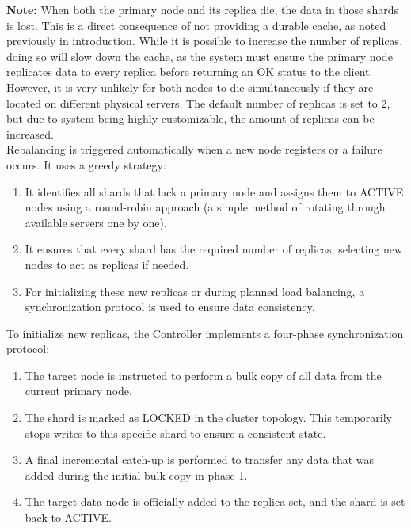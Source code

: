 \documentclass[shortabstract]{iithesis}
\begin{document}
\noindent \textbf{Note:} When both the primary node and its replica die, the data in those shards is lost. This is a direct consequence of not providing a durable cache, as noted previously in introduction. While it is possible to increase the number of replicas, doing so will slow down the cache, as the system must ensure the primary node replicates data to every replica before returning an OK status to the client. However, it is very unlikely for both nodes to die simultaneously if they are located on different physical servers. The default number of replicas is set to 2, but due to system being highly customizable, the amount of replicas can be increased.\\

\noindent Rebalancing is triggered automatically when a new node registers or a failure occurs. It uses a greedy strategy:
\begin{enumerate}
    \item It identifies all shards that lack a primary node and assigns them to ACTIVE nodes using a round-robin approach (a simple method of rotating through available servers one by one).
    \item It ensures that every shard has the required number of replicas, selecting new nodes to act as replicas if needed. 
    \item For initializing these new replicas or during planned load balancing, a synchronization protocol is used to ensure data consistency. 
\end{enumerate}

\noindent To initialize new replicas, the Controller implements a four-phase synchronization protocol:
\begin{enumerate}
    \item The target node is instructed to perform a bulk copy of all data from the current primary node.
    \item The shard is marked as LOCKED in the cluster topology. This temporarily stops writes to this specific shard to ensure a consistent state.
    \item A final incremental catch-up is performed to transfer any data that was added during the initial bulk copy in phase 1.
    \item The target data node is officially added to the replica set, and the shard is set back to ACTIVE. 
\end{enumerate}

\end{document}
